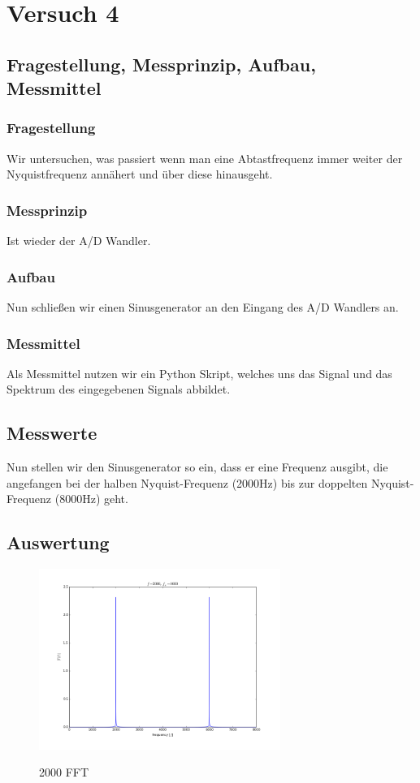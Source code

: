 \documentclass[TGAI_Laborbericht.tex]{subfiles}
\begin{document}
\chapter{Versuch 4}
\label{chap:VERSUCH_4}

\section{Fragestellung, Messprinzip, Aufbau, Messmittel}
\label{chap:VERSUCH_4_FRAGESTELLUNG}
\subsection{Fragestellung}
Wir untersuchen, was passiert wenn man eine Abtastfrequenz immer weiter der Nyquistfrequenz annähert und über diese hinausgeht.
\subsection{Messprinzip}
Ist wieder der A/D Wandler.
\subsection{Aufbau}
Nun schließen wir einen Sinusgenerator an den Eingang des A/D Wandlers an.
\subsection{Messmittel}
Als Messmittel nutzen wir ein Python Skript, welches uns das Signal und das Spektrum des eingegebenen Signals abbildet.
\section{Messwerte}
\label{chap:VERSUCH_4_MESSWERTE}
Nun stellen wir den Sinusgenerator so ein, dass er eine Frequenz ausgibt, die angefangen bei der halben Nyquist-Frequenz (2000Hz) bis zur doppelten Nyquist-Frequenz (8000Hz) geht.
\section{Auswertung}
\label{chap:VERSUCH_4_AUSWERTUNG}

\begin{figure}[H]
	\includegraphics[width=0.7\textwidth]{media/2000-fft.png}
	\label{Hoch}
	\caption{2000 FFT}
\end{figure}
\end{document}
